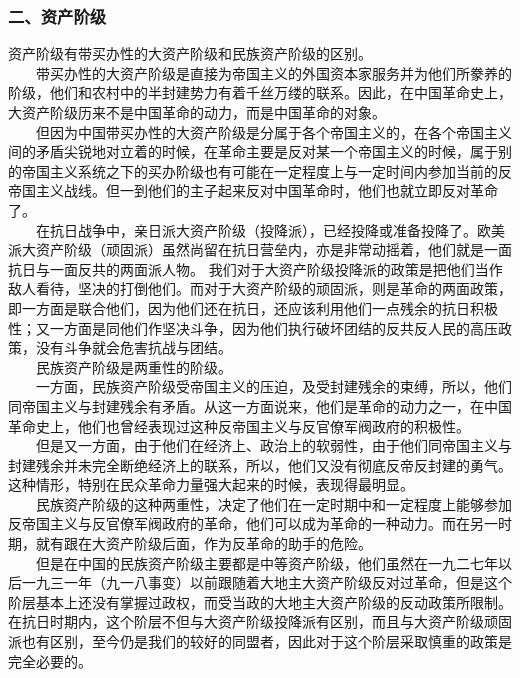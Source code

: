 \documentclass[cn,11pt,chinese]{elegantbook}
\def\myformat#1{\hfil\hfil #1}
\begin{document}
\subsubsection*{\myformat{二、资产阶级}}
资产阶级有带买办性的大资产阶级和民族资产阶级的区别。\\
　　带买办性的大资产阶级是直接为帝国主义的外国资本家服务并为他们所豢养的阶级，他们和农村中的半封建势力有着千丝万缕的联系。因此，在中国革命史上，大资产阶级历来不是中国革命的动力，而是中国革命的对象。\\
　　但因为中国带买办性的大资产阶级是分属于各个帝国主义的，在各个帝国主义间的矛盾尖锐地对立着的时候，在革命主要是反对某一个帝国主义的时候，属于别的帝国主义系统之下的买办阶级也有可能在一定程度上与一定时间内参加当前的反帝国主义战线。但一到他们的主子起来反对中国革命时，他们也就立即反对革命了。\\
　　在抗日战争中，亲日派大资产阶级（投降派），已经投降或准备投降了。欧美派大资产阶级（顽固派）虽然尚留在抗日营垒内，亦是非常动摇着，他们就是一面抗日与一面反共的两面派人物。 我们对于大资产阶级投降派的政策是把他们当作敌人看待，坚决的打倒他们。而对于大资产阶级的顽固派，则是革命的两面政策，即一方面是联合他们，因为他们还在抗日，还应该利用他们一点残余的抗日积极性；又一方面是同他们作坚决斗争，因为他们执行破坏团结的反共反人民的高压政策，没有斗争就会危害抗战与团结。\\
　　民族资产阶级是两重性的阶级。\\
　　一方面，民族资产阶级受帝国主义的压迫，及受封建残余的束缚，所以，他们同帝国主义与封建残余有矛盾。从这一方面说来，他们是革命的动力之一，在中国革命史上，他们也曾经表现过这种反帝国主义与反官僚军阀政府的积极性。\\
　　但是又一方面，由于他们在经济上、政治上的软弱性，由于他们同帝国主义与封建残余并未完全断绝经济上的联系，所以，他们又没有彻底反帝反封建的勇气。这种情形，特别在民众革命力量强大起来的时候，表现得最明显。\\
　　民族资产阶级的这种两重性，决定了他们在一定时期中和一定程度上能够参加反帝国主义与反官僚军阀政府的革命，他们可以成为革命的一种动力。而在另一时期，就有跟在大资产阶级后面，作为反革命的助手的危险。\\
　　但是在中国的民族资产阶级主要都是中等资产阶级，他们虽然在一九二七年以后一九三一年（九一八事变）以前跟随着大地主大资产阶级反对过革命，但是这个阶层基本上还没有掌握过政权，而受当政的大地主大资产阶级的反动政策所限制。在抗日时期内，这个阶层不但与大资产阶级投降派有区别，而且与大资产阶级顽固派也有区别，至今仍是我们的较好的同盟者，因此对于这个阶层采取慎重的政策是完全必要的。\\
\end{document}
